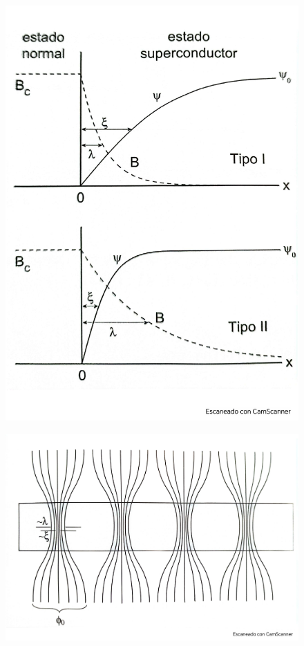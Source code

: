 \begin{figure}[h!] \centering
	\includegraphics[scale=0.5]{Cuerpo/Ch_11/Fotos libro 13.pdf}
	\caption{}
	\label{Fig:11-13}
\end{figure}
\begin{figure}[h!] \centering
	\includegraphics[scale=0.5]{Cuerpo/Ch_11/Fotos libro 14.pdf}
	\caption{}
	\label{Fig:11-14}
\end{figure}
